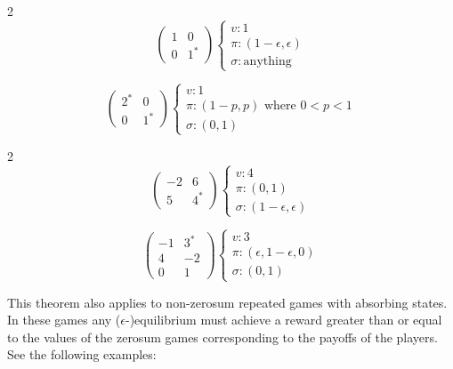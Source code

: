 \documentclass[12pt]{article}
\begin{document}
\begin{multicols}{2}
    \[ \begin{pmatrix}
        1 & 0 \\
        0 & 1^\ast
    \end{pmatrix} \begin{cases}
        v: 1 \\
        \pi: (1 - \epsilon, \epsilon) \\
        \sigma: \text{anything}
    \end{cases} \]

    \[ \begin{pmatrix}
        2^\ast & 0 \\
        0 & 1^\ast
    \end{pmatrix} \begin{cases}
        v: 1 \\
        \pi: (1 - p, p) \text{ where } 0 < p < 1 \\
        \sigma: (0, 1)
    \end{cases} \]
\end{multicols}
\begin{multicols}{2}
    \[ \begin{pmatrix}
        -2 & 6 \\
        5 & 4^\ast
    \end{pmatrix} \begin{cases}
        v: 4 \\
        \pi: (0, 1) \\
        \sigma: (1 - \epsilon, \epsilon)
    \end{cases} \]

    \[ \begin{pmatrix}
        -1 & 3^\ast \\
        4 & -2 \\
        0 & 1
    \end{pmatrix} \begin{cases}
        v: 3 \\
        \pi: (\epsilon, 1 - \epsilon, 0) \\
        \sigma: (0, 1)
    \end{cases} \]
\end{multicols}

\noindent
This theorem also applies to non-zerosum repeated games with absorbing states.
In these games any ($\epsilon$-)equilibrium must achieve a reward greater than or equal to the values of the zerosum games corresponding to the payoffs of the players.
See the following examples:
\end{document}
